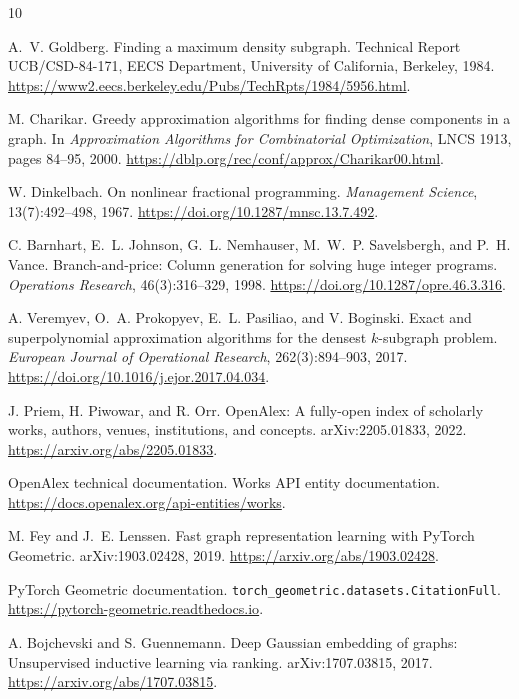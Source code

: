 \documentclass[11pt]{article}
\begin{document}
\begin{thebibliography}{10}
\sloppy

A.~V. Goldberg.
\newblock Finding a maximum density subgraph.
\newblock Technical Report UCB/CSD-84-171, EECS Department, University of
California, Berkeley, 1984.
\newblock \url{https://www2.eecs.berkeley.edu/Pubs/TechRpts/1984/5956.html}.

M. Charikar.
\newblock Greedy approximation algorithms for finding dense components in a
graph.
\newblock In \emph{Approximation Algorithms for Combinatorial Optimization},
LNCS 1913, pages 84--95, 2000.
\newblock \url{https://dblp.org/rec/conf/approx/Charikar00.html}.

W. Dinkelbach.
\newblock On nonlinear fractional programming.
\newblock \emph{Management Science}, 13(7):492--498, 1967.
\newblock \url{https://doi.org/10.1287/mnsc.13.7.492}.

C. Barnhart, E.~L. Johnson, G.~L. Nemhauser, M.~W.~P. Savelsbergh, and
P.~H. Vance.
\newblock Branch-and-price: Column generation for solving huge integer
programs.
\newblock \emph{Operations Research}, 46(3):316--329, 1998.
\newblock \url{https://doi.org/10.1287/opre.46.3.316}.

A. Veremyev, O.~A. Prokopyev, E.~L. Pasiliao, and V. Boginski.
\newblock Exact and superpolynomial approximation algorithms for the densest
$k$-subgraph problem.
\newblock \emph{European Journal of Operational Research}, 262(3):894--903,
2017.
\newblock \url{https://doi.org/10.1016/j.ejor.2017.04.034}.

J. Priem, H. Piwowar, and R. Orr.
\newblock OpenAlex: A fully-open index of scholarly works, authors, venues,
institutions, and concepts.
\newblock arXiv:2205.01833, 2022.
\newblock \url{https://arxiv.org/abs/2205.01833}.

OpenAlex technical documentation.
\newblock Works API entity documentation.
\newblock \url{https://docs.openalex.org/api-entities/works}.

M. Fey and J.~E. Lenssen.
\newblock Fast graph representation learning with PyTorch Geometric.
\newblock arXiv:1903.02428, 2019.
\newblock \url{https://arxiv.org/abs/1903.02428}.

PyTorch Geometric documentation.
\newblock \texttt{torch\_geometric.datasets.CitationFull}.
\newblock \url{https://pytorch-geometric.readthedocs.io}.

A. Bojchevski and S. Guennemann.
\newblock Deep Gaussian embedding of graphs: Unsupervised inductive learning
via ranking.
\newblock arXiv:1707.03815, 2017.
\newblock \url{https://arxiv.org/abs/1707.03815}.

\end{thebibliography}
\end{document}
